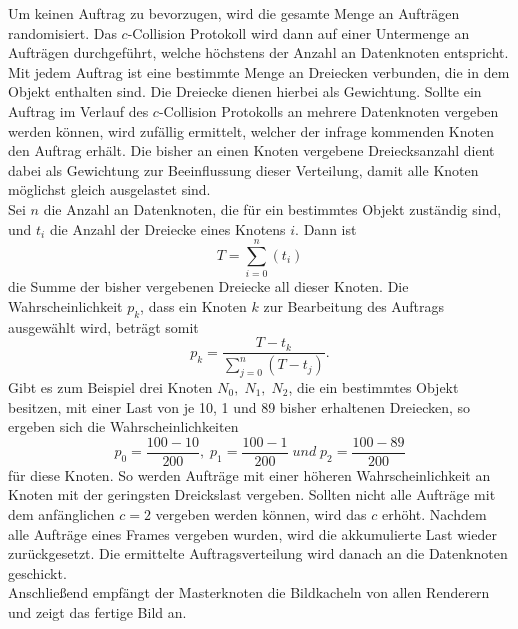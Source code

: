 Um keinen Auftrag zu bevorzugen, wird die gesamte Menge an Aufträgen randomisiert. Das $c$-Collision Protokoll wird dann auf einer Untermenge an Aufträgen durchgeführt, welche höchstens der Anzahl an Datenknoten entspricht. Mit jedem Auftrag ist eine bestimmte Menge an Dreiecken verbunden, die in dem Objekt enthalten sind. Die Dreiecke dienen hierbei als Gewichtung. Sollte ein Auftrag im Verlauf des $c$-Collision Protokolls an mehrere Datenknoten vergeben werden können, wird zufällig ermittelt, welcher der infrage kommenden Knoten den Auftrag erhält. Die bisher an einen Knoten vergebene Dreiecksanzahl dient dabei als Gewichtung zur Beeinflussung dieser Verteilung, damit alle Knoten möglichst gleich ausgelastet sind.\\
Sei $n$ die Anzahl an Datenknoten, die für ein bestimmtes Objekt zuständig sind, und $t_i$ die Anzahl der Dreiecke eines Knotens $i$. Dann ist
\[T=\sum_{i=0}^{n} \left(t_i\right)\]
die Summe der bisher vergebenen Dreiecke all dieser Knoten. Die Wahrscheinlichkeit $p_k$, dass ein Knoten $k$ zur Bearbeitung des Auftrags ausgewählt wird, beträgt somit 
  \[p_k=\frac{T-t_k}{\sum_{j=0}^{n} \left(T-t_j\right)}.\]
Gibt es zum Beispiel drei Knoten $N_0,\; N_1,\; N_2$, die ein bestimmtes Objekt besitzen, mit einer Last von je 10, 1 und 89 bisher erhaltenen Dreiecken, so ergeben sich die Wahrscheinlichkeiten
\[p_0=\frac{100-10}{200}, \;p_1=\frac{100-1}{200}\; und \;p_2=\frac{100-89}{200}\]
für diese Knoten. So werden Aufträge mit einer höheren Wahrscheinlichkeit an Knoten mit der geringsten Dreickslast vergeben. Sollten nicht alle Aufträge mit dem anfänglichen $c=2$ vergeben werden können, wird das $c$ erhöht. Nachdem alle Aufträge eines Frames vergeben wurden, wird die akkumulierte Last wieder zurückgesetzt. Die ermittelte Auftragsverteilung wird danach an die Datenknoten geschickt.\\
Anschließend empfängt der Masterknoten die Bildkacheln von allen Renderern und zeigt das fertige Bild an.

